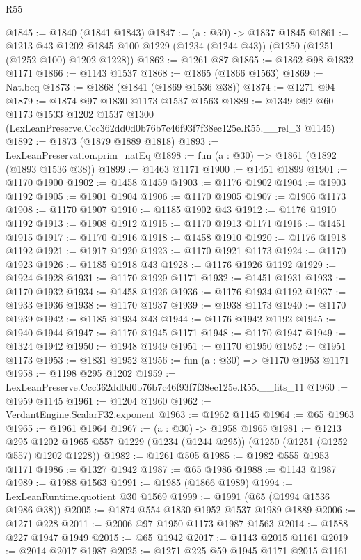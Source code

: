 \begin{lexlean}{R55}
\begin{coremodule}
@1845 := @1840 (@1841 @1843)
@1847 := (a : @30) -> @1837 @1845
@1861 := @1213
    @43
    @1202
    @1845
    @100
    @1229
    (@1234 (@1244 @43))
    (@1250 (@1251 (@1252 @100) @1202 @1228))
@1862 := @1261 @87
@1865 := @1862 @98 @1832 @1171
@1866 := @1143 @1537
@1868 := @1865 (@1866 @1563)
@1869 := Nat.beq
@1873 := @1868 (@1841 (@1869 @1536 @38))
@1874 := @1271 @94
@1879 := @1874 @97 @1830 @1173 @1537 @1563
@1889 := @1349
    @92
    @60
    @1173
    @1533
    @1202
    @1537
    @1300
    (LexLeanPreserve.Ccc362dd0d0b76b7c46f93f7f38ec125e.R55.__rel_3 @1145)
@1892 := @1873 (@1879 @1889 @1818)
@1893 := LexLeanPreservation.prim_natEq
@1898 := fun (a : @30) => @1861 (@1892 (@1893 @1536 @38))
@1899 := @1463 @1171
@1900 := @1451 @1899
@1901 := @1170 @1900
@1902 := @1458 @1459
@1903 := @1176 @1902
@1904 := @1903 @1192
@1905 := @1901 @1904
@1906 := @1170 @1905
@1907 := @1906 @1173
@1908 := @1170 @1907
@1910 := @1185 @1902 @43
@1912 := @1176 @1910 @1192
@1913 := @1908 @1912
@1915 := @1170 @1913 @1171
@1916 := @1451 @1915
@1917 := @1170 @1916
@1918 := @1458 @1910
@1920 := @1176 @1918 @1192
@1921 := @1917 @1920
@1923 := @1170 @1921 @1173
@1924 := @1170 @1923
@1926 := @1185 @1918 @43
@1928 := @1176 @1926 @1192
@1929 := @1924 @1928
@1931 := @1170 @1929 @1171
@1932 := @1451 @1931
@1933 := @1170 @1932
@1934 := @1458 @1926
@1936 := @1176 @1934 @1192
@1937 := @1933 @1936
@1938 := @1170 @1937
@1939 := @1938 @1173
@1940 := @1170 @1939
@1942 := @1185 @1934 @43
@1944 := @1176 @1942 @1192
@1945 := @1940 @1944
@1947 := @1170 @1945 @1171
@1948 := @1170 @1947
@1949 := @1324 @1942
@1950 := @1948 @1949
@1951 := @1170 @1950
@1952 := @1951 @1173
@1953 := @1831 @1952
@1956 := fun (a : @30) => @1170 @1953 @1171
@1958 := @1198 @295 @1202
@1959 := LexLeanPreserve.Ccc362dd0d0b76b7c46f93f7f38ec125e.R55.__fits_11
@1960 := @1959 @1145
@1961 := @1204 @1960
@1962 := VerdantEngine.ScalarF32.exponent
@1963 := @1962 @1145
@1964 := @65 @1963
@1965 := @1961 @1964
@1967 := (a : @30) -> @1958 @1965
@1981 := @1213
    @295
    @1202
    @1965
    @557
    @1229
    (@1234 (@1244 @295))
    (@1250 (@1251 (@1252 @557) @1202 @1228))
@1982 := @1261 @505
@1985 := @1982 @555 @1953 @1171
@1986 := @1327 @1942
@1987 := @65 @1986
@1988 := @1143 @1987
@1989 := @1988 @1563
@1991 := @1985 (@1866 @1989)
@1994 := LexLeanRuntime.quotient @30 @1569
@1999 := @1991 (@65 (@1994 @1536 @1986 @38))
@2005 := @1874 @554 @1830 @1952 @1537 @1989 @1889
@2006 := @1271 @228
@2011 := @2006 @97 @1950 @1173 @1987 @1563
@2014 := @1588 @227 @1947 @1949
@2015 := @65 @1942
@2017 := @1143 @2015 @1161
@2019 := @2014 @2017 @1987
@2025 := @1271 @225 @59 @1945 @1171 @2015 @1161

\end{coremodule}
\end{lexlean}
